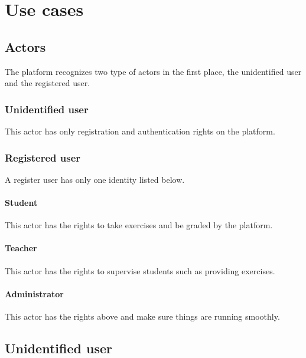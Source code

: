 \chapter{Use cases}
\section{Actors}
	The platform recognizes two type of actors in the first place, the unidentified user and the registered user.
	\subsection{Unidentified user}
		This actor has only registration and authentication rights on the platform.
	\subsection{Registered user}
		A register user has only one identity listed below.
		\subsubsection{Student}
			This actor has the rights to take exercises and be graded by the platform.
		\subsubsection{Teacher}
			This actor has the rights to supervise students such as providing exercises.
		\subsubsection{Administrator}
			This actor has the rights above and make sure things are running smoothly.
\newpage
\section{Unidentified user}
